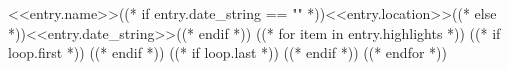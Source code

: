 \resumeNormalSubheading
    {<<entry.name>>}{((* if entry.date_string == "" *))<<entry.location>>((* else *))<<entry.date_string>>((* endif *))}
((* for item in entry.highlights *))
    ((* if loop.first *))
    \resumeItemListStart
    ((* endif *))
    ((* if loop.last *))
    \resumeItemListEnd
    ((* endif *))
((* endfor *))